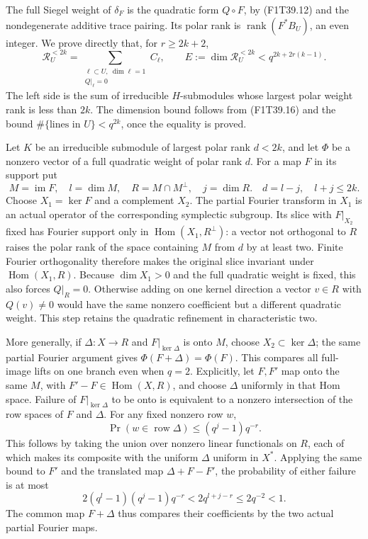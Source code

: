 The full Siegel weight of \(\delta_F\) is the quadratic
form \(Q\circ F\), by (F1T39.12) and the nondegenerate
additive trace pairing. Its polar rank is
\(\operatorname{rank}(F^*B_U)\), an even integer.
We prove directly that, for \(r\ge2k+2\),
\[
 \mathcal R_U^{<2k}=
   \sum_{\substack{\ell\subset U,\ \dim\ell=1\\Q|_\ell=0}}C_\ell,
 \qquad
 E:=\dim\mathcal R_U^{<2k}<q^{2k+2r(k-1)}.
 \tag{F1T39.17}
\]
The left side is the sum of irreducible \(H\)-submodules
whose largest polar weight rank is less than \(2k\).
The dimension bound follows from (F1T39.16) and the bound
\(\#\{\text{lines in }U\}<q^{2k}\), once the equality
is proved.

Let \(K\) be an irreducible submodule of largest polar
rank \(d<2k\), and let \(\Phi\) be a nonzero vector of
a full quadratic weight of polar rank \(d\). For a map
\(F\) in its support put
\[
 M=\operatorname{im}F,\quad l=\dim M,\quad
 R=M\cap M^\perp,\quad j=\dim R.
 \quad d=l-j,\quad l+j\le2k.
 \tag{F1T39.18}
\]
Choose \(X_1=\ker F\) and a complement \(X_2\).
The partial Fourier transform in \(X_1\) is an actual
operator of the corresponding symplectic subgroup.
Its slice with \(F|_{X_2}\) fixed has Fourier support
only in \(\operatorname{Hom}(X_1,R^\perp)\): a vector
not orthogonal to \(R\) raises the polar rank of the
space containing \(M\) from \(d\) by at least two.
Finite Fourier orthogonality therefore makes the original
slice invariant under \(\operatorname{Hom}(X_1,R)\).
Because \(\dim X_1>0\) and the full quadratic weight
is fixed, this also forces \(Q|_R=0\). Otherwise adding
on one kernel direction a vector \(v\in R\) with
\(Q(v)\ne0\) would have the same nonzero coefficient
but a different quadratic weight. This step retains the
quadratic refinement in characteristic two.

More generally, if \(\Delta:X\to R\) and
\(F|_{\ker\Delta}\) is onto \(M\), choose
\(X_2\subset\ker\Delta\); the same partial Fourier
argument gives \(\Phi(F+\Delta)=\Phi(F)\).
This compares all full-image lifts on one branch even
when \(q=2\). Explicitly, let \(F,F'\) map onto the
same \(M\), with \(F'-F\in\operatorname{Hom}(X,R)\),
and choose \(\Delta\) uniformly in that Hom space.
Failure of \(F|_{\ker\Delta}\) to be onto is equivalent
to a nonzero intersection of the row spaces of \(F\)
and \(\Delta\). For any fixed nonzero row \(w\),
\[
 \Pr(w\in\operatorname{row}\Delta)
       \le(q^j-1)q^{-r}.
 \tag{F1T39.19}
\]
This follows by taking the union over nonzero linear
functionals on \(R\), each of which makes its composite
with the uniform \(\Delta\) uniform in \(X^*\).
Applying the same bound to \(F'\) and the translated
map \(\Delta+F-F'\), the probability of either failure
is at most
\[
 2(q^l-1)(q^j-1)q^{-r}
       <2q^{l+j-r}\le2q^{-2}<1.
 \tag{F1T39.20}
\]
The common map \(F+\Delta\) thus compares their
coefficients by the two actual partial Fourier maps.

